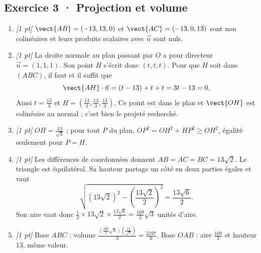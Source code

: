 \subsection*{Exercice 3 · Projection et volume}\begin{enumerate}

\item \textit{[1 pt]} $\vect{AB}=(-13,13,0)$ et $\vect{AC}=(-13,0,13)$ sont non colinéaires et leurs produits scalaires avec $\vec n$ sont nuls.

\item \textit{[1 pt]} La droite normale au plan passant par $O$ a pour directeur $\vec n=(1,1,1)$. Son point $H$ s'écrit donc $(t,t,t)$. Pour que $H$ soit dans $(ABC)$, il faut et il suffit que
\[\vect{AH}\cdot\vec n=(t-13)+t+t=3t-13=0.\]
Ainsi $t=\frac{13}{3}$ et $H=(\frac{13}{3},\frac{13}{3},\frac{13}{3})$. Ce point est dans le plan et $\vect{OH}$ est colinéaire au normal ; c'est bien le projeté recherché.

\item \textit{[1 pt]} $OH=\frac{13}{\sqrt{3}}$ ; pour tout $P$ du plan, $OP^2=OH^2+HP^2\ge OH^2$, égalité seulement pour $P=H$.

\item \textit{[1 pt]} Les différences de coordonnées donnent $AB=AC=BC=13\sqrt2$. Le triangle est équilatéral. Sa hauteur partage un côté en deux parties égales et vaut
\[\sqrt{(13\sqrt2)^2-(\frac{13\sqrt{2}}{2})^2}=\frac{13\sqrt6}{2}.\]
Son aire vaut donc $\frac12\times 13\sqrt2\times\frac{13\sqrt6}{2}=\frac{169}{2}\sqrt3$ unités d'aire.

\item \textit{[1 pt]} Base $ABC$ : volume $\frac{(\frac{169}{2}\sqrt3)(\frac{13}{\sqrt{3}})}{3}=\frac{2197}{6}$. Base $OAB$ : aire $\frac{169}{2}$ et hauteur $13$, même valeur.

\end{enumerate}

